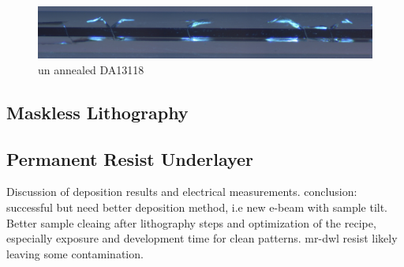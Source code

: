 \begin{figure}[h]
    \centering
    \includegraphics[width=\textwidth]{fig/polishing/e944.jpg}
    \caption{un annealed DA13118}
    \label{fig:my_label}
\end{figure}
\FloatBarrier
\subsection{Maskless Lithography}
\subsection{Permanent Resist Underlayer}
Discussion of deposition results and electrical measurements. 
conclusion: successful but need better deposition method, i.e new e-beam with sample tilt. Better sample cleaing after lithography steps and optimization of the recipe, especially exposure and development time for clean patterns. mr-dwl resist likely leaving some contamination.

